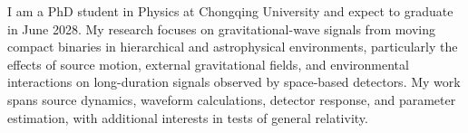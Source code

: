 
\begin{cvparagraph}
I am a PhD student in Physics at Chongqing University and expect to graduate in June 2028. My research focuses on gravitational-wave signals from moving compact binaries in hierarchical and astrophysical environments, particularly the effects of source motion, external gravitational fields, and environmental interactions on long-duration signals observed by space-based detectors. My work spans source dynamics, waveform calculations, detector response, and parameter estimation, with additional interests in tests of general relativity.
\end{cvparagraph}
